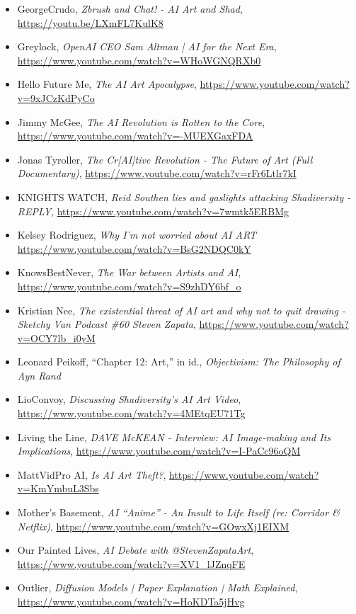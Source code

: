 \documentclass[11pt]{article}
\begin{document}
\begin{itemize}
\item GeorgeCrudo, \emph{Zbrush and Chat! - AI Art and Shad}, \url{https://youtu.be/LXmFL7KulK8}
\item Greylock, \emph{OpenAI CEO Sam Altman | AI for the Next Era}, \url{https://www.youtube.com/watch?v=WHoWGNQRXb0}
\item Hello Future Me, \emph{The AI Art Apocalypse}, \url{https://www.youtube.com/watch?v=9xJCzKdPyCo}
\item Jimmy McGee, \emph{The AI Revolution is Rotten to the Core}, \url{https://www.youtube.com/watch?v=-MUEXGaxFDA}
\item Jonas Tyroller, \emph{The Cr[AI]tive Revolution - The Future of Art (Full Documentary)}, \url{https://www.youtube.com/watch?v=rFr6Ltlr7kI}
\item KNIGHTS WATCH, \emph{Reid Southen lies and gaslights attacking Shadiversity - REPLY}, \url{https://www.youtube.com/watch?v=7wmtk5ERBMg}
\item Kelsey Rodriguez, \emph{Why I'm not worried about AI ART} \url{https://www.youtube.com/watch?v=BsG2NDQC0kY}
\item KnowsBestNever, \emph{The War between Artists and AI}, \url{https://www.youtube.com/watch?v=S9zhDY6bf\_o}
\item Kristian Nee, \emph{The existential threat of AI art and why not to quit drawing - Sketchy Van Podcast \#60 Steven Zapata}, \url{https://www.youtube.com/watch?v=OCY7lb\_i0yM}
\item Leonard Peikoff, ``Chapter 12: Art,'' in id., \emph{Objectivism: The Philosophy of Ayn Rand}
\item LioConvoy, \emph{Discussing Shadiversity's AI Art Video}, \url{https://www.youtube.com/watch?v=4MEtqEU71Tg}
\item Living the Line, \emph{DAVE McKEAN - Interview: AI Image-making and Its Implications}, \url{https://www.youtube.com/watch?v=I-PaCc96oQM}
\item MattVidPro AI, \emph{Is AI Art Theft?}, \url{https://www.youtube.com/watch?v=KmYmbuL3Sbs}
\item Mother's Basement, \emph{AI ``Anime'' - An Insult to Life Itself (re: Corridor \& Netflix)}, \url{https://www.youtube.com/watch?v=GOwxXj1EIXM}
\item Our Painted Lives, \emph{AI Debate with @StevenZapataArt}, \url{https://www.youtube.com/watch?v=XV1\_lJZnqFE}
\item Outlier, \emph{Diffusion Models | Paper Explanation | Math Explained}, \url{https://www.youtube.com/watch?v=HoKDTa5jHvg}

\end{itemize}
\end{document}
